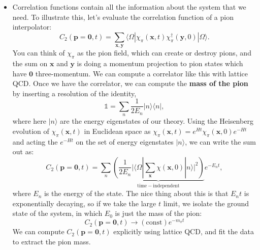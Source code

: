\documentclass[12pt, oneside]{article}   	%
\theoremstyle{definition}
\begin{document}
\begin{itemize}
	\item Correlation functions contain all the information about the system that we need. To illustrate this, let's evaluate the correlation function of a pion interpolator:
	\begin{equation}
		C_2(\bm p = \bm 0, t) = \sum_{\bm x, \bm y} \langle \Omega | \chi_\pi(\bm x, t) \chi_{\pi}^\dagger(\bm y, 0) | \Omega\rangle.
	\end{equation}
	You can think of $\chi_{\pi}$ as the pion field, which can create or destroy pions, and the sum on $\bm x$ and $\bm y$ is doing a momentum projection to pion states which have $\bm 0$ three-momentum. We can compute a correlator like this with lattice QCD. Once we have the correlator, we can compute the \textbf{mass of the pion} by inserting a resolution of the identity,
	\begin{equation}
		\mathbb 1 = \sum_n \frac{1}{2 E_n} |n\rangle\langle n|,
	\end{equation}
	where here $|n\rangle$ are the energy eigenstates of our theory. Using the Heisenberg evolution of $\chi_\pi(\bm x, t)$ in Euclidean space as $\chi_\pi(\bm x, t) = e^{Ht} \chi_\pi(\bm x, 0) e^{-Ht}$ and acting the $e^{-Ht}$ on the set of energy eigenstates $|n\rangle$, we can write the sum out as:
	\begin{equation}
		C_2(\bm p = \bm 0, t) = \sum_{n} \underbrace{ \left(\frac{1}{2 E_n} \bigg| \langle \Omega | \sum_{\bm x} \chi(\bm x, 0) | n\rangle \bigg|^2\right) }_{\mathrm{time-independent}} e^{-E_n t},
	\end{equation}
	where $E_n$ is the energy of the state. The nice thing about this is that $E_n t$ is exponentially decaying, so if we take the large $t$ limit, we isolate the ground state of the system, in which $E_0$ is just the mass of the pion:
	\begin{equation}
		C_2(\bm p = \bm 0, t) \longrightarrow (\mathrm{const}) e^{-m_\pi t}
	\end{equation}
	We can compute $C_2(\bm p = \bm 0, t)$ explicitly using lattice QCD, and fit the data to extract the pion mass. 

\end{itemize}



\end{document}
